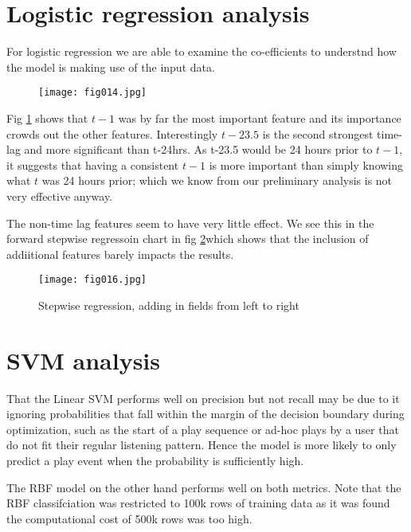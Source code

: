 \section{Logistic regression analysis}

For logistic regression we are able to examine the co-efficients to understnd how the model is making use of the input data.

\begin{figure}[h!]
	\centering
	\texttt{[image: fig014.jpg]}
	\caption{}
	\label{fig14}
\end{figure} 

Fig \ref{fig14} shows that $t-1$ was by far the most important feature and its importance crowds out the other features. Interestingly $t-23.5$ is the second strongest time-lag and more significant than t-24hrs. As t-23.5 would be 24 hours prior to $t-1$, it suggests that having a consistent $t-1$ is more important than simply knowing what $t$ was 24 hours prior; which we know from our preliminary analysis is not very effective anyway.

The non-time lag features seem to have very little effect. We see this in the forward stepwise regressoin chart in fig \ref{fig16}which shows that the inclusion of addiitional features barely impacts the results.

\begin{figure}[h!]
	\centering
	\texttt{[image: fig016.jpg]}
	\caption{Stepwise regression, adding in fields from left to right}
	\label{fig16}
\end{figure} 

\section{SVM analysis}

That the Linear SVM performs well on precision but not recall may be due to it ignoring probabilities that fall within the margin of the decision boundary during optimization, such as the start of a play sequence or ad-hoc plays by a user that do not fit their regular listening pattern. Hence the model is more likely to only predict a play event when the probability is sufficiently high.

The RBF model on the other hand performs well on both metrics. Note that the RBF classifciation was restricted to 100k rows of training data as it was found the computational cost of 500k rows was too high. 

